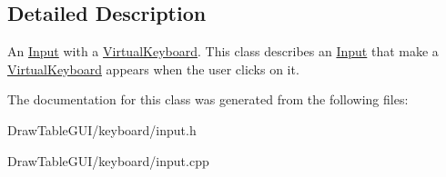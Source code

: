 \subsection{Detailed Description}
An \hyperlink{classInput}{Input} with a \hyperlink{classVirtualKeyboard}{Virtual\+Keyboard}. This class describes an \hyperlink{classInput}{Input} that make a \hyperlink{classVirtualKeyboard}{Virtual\+Keyboard} appears when the user clicks on it. 

The documentation for this class was generated from the following files\+:\begin{DoxyCompactItemize}
\item 
Draw\+Table\+G\+U\+I/keyboard/input.\+h\item 
Draw\+Table\+G\+U\+I/keyboard/input.\+cpp\end{DoxyCompactItemize}
